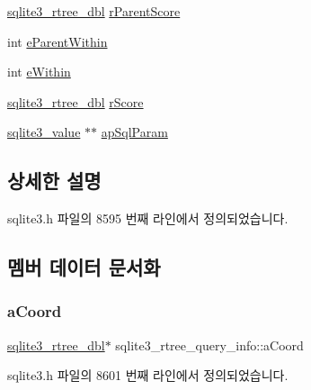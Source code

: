 \begin{DoxyCompactItemize}
\item 
\hyperlink{sqlite3_8h_ae9156ff58620c1ceae9391f1afabae1b}{sqlite3\+\_\+rtree\+\_\+dbl} \hyperlink{structsqlite3__rtree__query__info_af7da93e7fc405eec7e7ec90ab237eab2}{r\+Parent\+Score}
\item 
int \hyperlink{structsqlite3__rtree__query__info_a8bd37c6af5427c35830f674a4db682c3}{e\+Parent\+Within}
\item 
int \hyperlink{structsqlite3__rtree__query__info_ad1038309f7ea55472a7ff99bf4f9d514}{e\+Within}
\item 
\hyperlink{sqlite3_8h_ae9156ff58620c1ceae9391f1afabae1b}{sqlite3\+\_\+rtree\+\_\+dbl} \hyperlink{structsqlite3__rtree__query__info_af449e4a3607573d17b3d31c67b6e1584}{r\+Score}
\item 
\hyperlink{sqlite3_8h_ac2fa1ecdb2290d9af6010edbd1cbc83c}{sqlite3\+\_\+value} $\ast$$\ast$ \hyperlink{structsqlite3__rtree__query__info_a57ccb3cce45dd946e5184b5addeb0326}{ap\+Sql\+Param}
\end{DoxyCompactItemize}


\subsection{상세한 설명}


sqlite3.\+h 파일의 8595 번째 라인에서 정의되었습니다.



\subsection{멤버 데이터 문서화}
\mbox{\label{structsqlite3__rtree__query__info_a9d6e605e62fcf49d57dfc0d192076542}} 
\subsubsection{\texorpdfstring{a\+Coord}{aCoord}}
{\footnotesize\ttfamily \hyperlink{sqlite3_8h_ae9156ff58620c1ceae9391f1afabae1b}{sqlite3\+\_\+rtree\+\_\+dbl}$\ast$ sqlite3\+\_\+rtree\+\_\+query\+\_\+info\+::a\+Coord}



sqlite3.\+h 파일의 8601 번째 라인에서 정의되었습니다.

\mbox{\label{structsqlite3__rtree__query__info_ace9f952557eb7b0e050d879ebb80905a}} 
